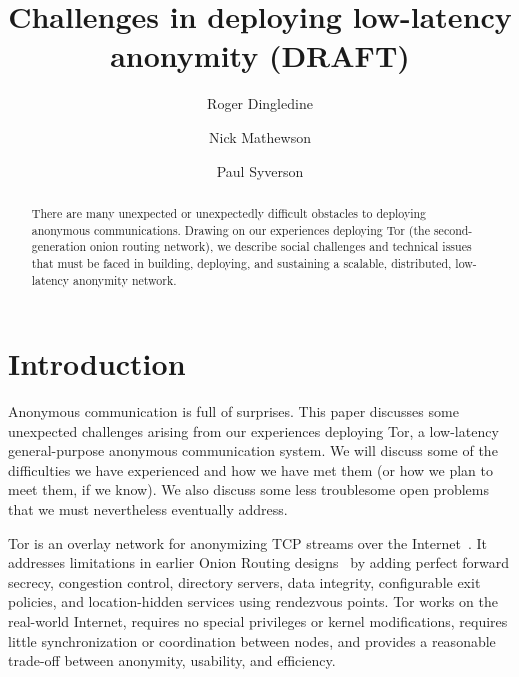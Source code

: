 \documentclass{llncs}
\begin{document}
\title{Challenges in deploying low-latency anonymity (DRAFT)}

\author{Roger Dingledine \and
Nick Mathewson \and
Paul Syverson}

\maketitle
\pagestyle{plain}

\begin{abstract}
  There are many unexpected or unexpectedly difficult obstacles to
  deploying anonymous communications.  Drawing on our experiences deploying
  Tor (the second-generation onion routing network), we describe social
  challenges and technical issues that must be faced
  in building, deploying, and sustaining a scalable, distributed, low-latency
  anonymity network.
\end{abstract}

\section{Introduction}
Anonymous communication is full of surprises.  This paper discusses some
unexpected challenges arising from our experiences deploying Tor, a
low-latency general-purpose anonymous communication system.  We will discuss
some of the difficulties we have experienced and how we have met them (or how
we plan to meet them, if we know).  We also discuss some less
troublesome open problems that we must nevertheless eventually address.

Tor is an overlay network for anonymizing TCP streams over the
Internet~\cite{tor-design}.  It addresses limitations in earlier Onion
Routing designs~\cite{or-ih96,or-jsac98,or-discex00,or-pet00} by adding
perfect forward secrecy, congestion control, directory servers, data
integrity, configurable exit policies, and location-hidden services using
rendezvous points.  Tor works on the real-world Internet, requires no special
privileges or kernel modifications, requires little synchronization or
coordination between nodes, and provides a reasonable trade-off between
anonymity, usability, and efficiency.
\end{document}
